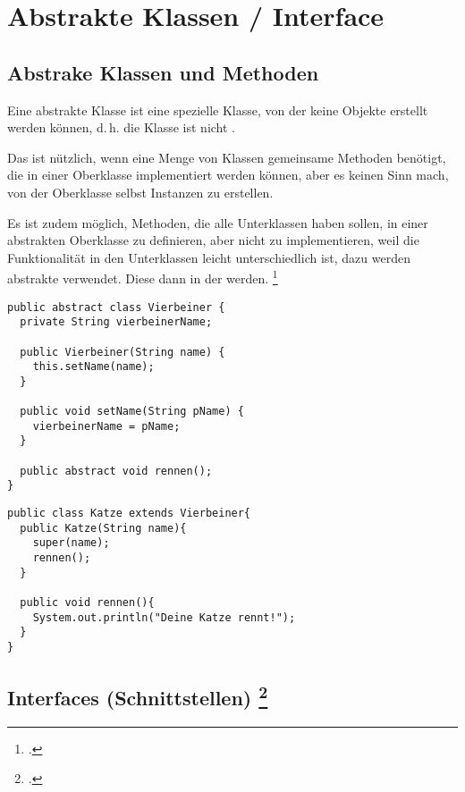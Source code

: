 \documentclass{lehramt-informatik}
\begin{document}
\chapter{Abstrakte Klassen / Interface}

\cite[Vererbung Seite 28-31 (PDF Seite 156-159)]{brinda}

\section{Abstrake Klassen und Methoden}

Eine abstrakte Klasse ist eine spezielle Klasse, von der keine Objekte
erstellt werden können, d.\,h. die Klasse ist nicht .

Das ist nützlich, wenn eine Menge von Klassen gemeinsame Methoden
benötigt, die in einer Oberklasse implementiert werden können, aber es
keinen Sinn mach, von der Oberklasse selbst Instanzen zu erstellen.

Es ist zudem möglich, Methoden, die alle Unterklassen haben sollen, in
einer abstrakten Oberklasse zu definieren, aber nicht zu implementieren,
weil die Funktionalität in den Unterklassen leicht unterschiedlich ist,
dazu werden abstrakte  verwendet. Diese 
dann in der  werden.
\footcite[Seite 31]{oomup:fs:3}

\begin{verbatim}
public abstract class Vierbeiner {
  private String vierbeinerName;

  public Vierbeiner(String name) {
    this.setName(name);
  }

  public void setName(String pName) {
    vierbeinerName = pName;
  }

  public abstract void rennen();
}
\end{verbatim}

\begin{verbatim}
public class Katze extends Vierbeiner{
  public Katze(String name){
    super(name);
    rennen();
  }

  public void rennen(){
    System.out.println("Deine Katze rennt!");
  }
}
\end{verbatim}

\section{Interfaces (Schnittstellen)
\footcite[Vererbung Seite 32-38 (PDF Seite 160-166)]{brinda}}
\end{document}
